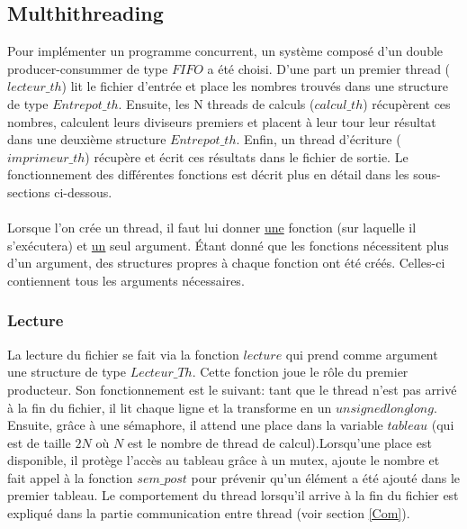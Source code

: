 \documentclass{article}
\begin{document}
\subsection{Multhithreading}
Pour implémenter un programme concurrent, un système composé d'un double producer-consummer de type $FIFO$ a été choisi. D'une part un premier thread ($lecteur\_th$) lit le fichier d'entrée et place les nombres trouvés dans une structure de type $Entrepot\_th$. Ensuite, les N threads de calculs ($calcul\_th$) récupèrent ces nombres, calculent leurs diviseurs premiers et placent à leur tour leur résultat dans une deuxième structure $Entrepot\_th$. Enfin, un thread d'écriture ($imprimeur\_th$) récupère et écrit ces résultats dans le fichier de sortie. Le fonctionnement des différentes fonctions est décrit plus en détail dans les sous-sections ci-dessous.\\ 
\\ \danger Lorsque l'on crée un thread, il faut lui donner \underline{une} fonction (sur laquelle il s'exécutera) et \underline{un} seul argument. Étant donné que les fonctions nécessitent plus d'un argument, des structures propres à chaque fonction ont été créés. Celles-ci contiennent tous les arguments nécessaires.

\subsubsection{Lecture}
La lecture du fichier se fait via la fonction $lecture$ qui prend comme argument une structure de type $Lecteur\_Th$. Cette fonction joue le rôle du premier producteur. Son fonctionnement est le suivant: tant que le thread n'est pas arrivé à la fin du fichier, il lit chaque ligne et la transforme en un $unsigned long long$. Ensuite, grâce à une sémaphore, il attend une place dans la variable $tableau$ (qui est de taille $2N$ où $N$ est le nombre de thread de calcul).Lorsqu'une place est disponible, il protège l'accès au tableau grâce à un mutex, ajoute le nombre et fait appel à la fonction $sem\_post$ pour prévenir qu'un élément a été ajouté dans le premier tableau.
Le comportement du thread lorsqu'il arrive à la fin du fichier est expliqué dans la partie communication entre thread (voir section \ref{Com}).
\end{document}
